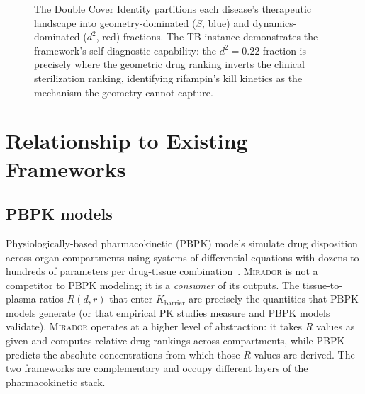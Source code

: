 \documentclass[11pt]{article}
\theoremstyle{plain}
\theoremstyle{definition}
\newcommand{\mirador}{\textsc{Mirador}}
\newcommand{\Kbarr}{K_{\mathrm{barrier}}}
\begin{document}
\begin{figure}[t]
\caption{The Double Cover Identity partitions each disease's
therapeutic landscape into geometry-dominated ($S$, blue) and
dynamics-dominated ($d^2$, red) fractions. The TB instance
demonstrates the framework's self-diagnostic capability: the
$d^2 = 0.22$ fraction is precisely where the geometric drug
ranking inverts the clinical sterilization ranking, identifying
rifampin's kill kinetics as the mechanism the geometry
cannot capture.}
\label{fig:double-cover-partition}
\end{figure}

\section{Relationship to Existing Frameworks}
\label{sec:related}

\subsection{PBPK models}
\label{sec:rel-pbpk}

Physiologically-based pharmacokinetic (PBPK) models simulate drug
disposition across organ compartments using systems of differential
equations with dozens to hundreds of parameters per drug-tissue
combination~\cite{Jones2015, Nestorov2003, Kuepfer2016}. \mirador{}
is not a competitor to PBPK modeling; it is a \emph{consumer} of
its outputs. The tissue-to-plasma ratios $R(d, r)$ that enter
$\Kbarr$ are precisely the quantities that PBPK models generate
(or that empirical PK studies measure and PBPK models validate).
\mirador{} operates at a higher level of abstraction: it takes $R$
values as given and computes relative drug rankings across
compartments, while PBPK predicts the absolute concentrations from
which those $R$ values are derived. The two frameworks are
complementary and occupy different layers of the pharmacokinetic
stack.

\end{document}
